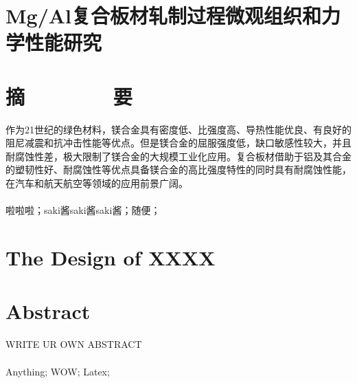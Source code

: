 \section*{\heiti Mg/Al复合板材轧制过程微观组织和力学性能研究}
\section*{\heiti 摘\ \ \ \ \ \ \ \ 要}

作为21世纪的绿色材料，镁合金具有密度低、比强度高、导热性能优良、有良好的阻尼减震和抗冲击性能等优点。但是镁合金的屈服强度低，缺口敏感性较大，并且耐腐蚀性差，极大限制了镁合金的大规模工业化应用。复合板材借助于铝及其合金的塑韧性好、耐腐蚀性等优点具备镁合金的高比强度特性的同时具有耐腐蚀性能，在汽车和航天航空等领域的应用前景广阔。
\\
\leavevmode %
\\
啦啦啦；saki酱saki酱saki酱；随便；

\clearpage


\section*{\bfseries The Design of XXXX}



\section*{\bfseries Abstract}

WRITE UR OWN ABSTRACT
\\
\leavevmode  %
\\
Anything; WOW; Latex;

\clearpage




